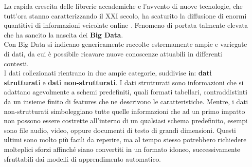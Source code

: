La rapida crescita delle librerie accademiche e l'avvento di nuove tecnologie, che tutt'ora stanno caratterizzando il XXI secolo, ha scaturito la diffusione di enormi quantitivi di informazioni veicolate online \cite{2023arXiv230913761W}. Fenomeno di portata talmente elevata che ha sancito la nascita dei \textbf{Big Data}. \vspace{7pt} \\
Con Big Data si indicano genericamente raccolte estremamente ampie e variegate di dati, da cui è possibile ricavare nuove conoscenze attuabili in differenti contesti. \vspace{7pt} \\
I dati collezionati rientrano in due ampie categorie, suddivise in: \textbf{dati strutturati} e \textbf{dati non-strutturati}. I dati strutturati sono informazioni che si adattano agevolmente a schemi predefiniti, quali formati tabellari, contraddistinti da un insieme finito di features che ne descrivono le caratteristiche. Mentre, i dati non-strutturati simboleggiano tutte quelle informazioni che ad un primo impatto non possono essere costrette all'interno di un qualsiasi schema predefinito, esempi sono file audio, video, oppure documenti di testo di grandi dimensioni. Questi ultimi sono molto più facili da reperire, ma al tempo stesso potrebbero richiedere molteplici sforzi affinché siano convertiti in un formato idoneo, successivamente sfruttabili dai modelli di apprendimento automatico. 